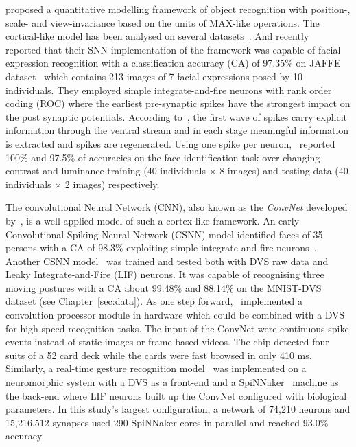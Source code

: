 \cite{riesenhuber1999hierarchical} proposed a quantitative modelling framework of object recognition with position-, scale- and view-invariance based on the units of MAX-like operations.
The cortical-like model has been analysed on several datasets~\citep{serre2007robust}.
And recently~\cite{fu2012spiking} reported that their SNN implementation of the framework was capable of facial expression recognition with a classification accuracy (CA) of 97.35\% on JAFFE dataset~\citep{lyons1998coding} which contains 213 images of 7 facial expressions posed by 10 individuals.
They employed simple integrate-and-fire neurons with rank order coding (ROC) where  the earliest pre-synaptic spikes have the strongest impact on the post synaptic potentials.
According to~\cite{vanrullen2002surfing}, the first wave of spikes  carry explicit information through the ventral stream and in each stage meaningful information is extracted and spikes are regenerated. 
Using one spike per neuron,~\cite{delorme2001face} reported 100\% and 97.5\% of accuracies on the face identification task over changing  contrast and luminance training (40 individuals $\times$ 8 images) and testing data (40 individuals $\times$ 2 images) respectively.

The convolutional Neural Network (CNN), also known as the \textit{ConvNet} developed by~\cite{lecun1998gradient}, is a well applied model of such a cortex-like framework.
An early Convolutional Spiking Neural Network (CSNN) model identified faces of 35 persons with a CA of 98.3\% exploiting simple integrate and fire neurons~\citep{matsugu2002convolutional}.
Another CSNN model~\citep{zhao2014feedforward} was trained and tested both with DVS raw data and Leaky Integrate-and-Fire (LIF) neurons.
It was capable of recognising three moving postures with a CA about 99.48\% and 88.14\% on the MNIST-DVS dataset (see Chapter~\ref{sec:data}).
As one step forward,~\cite{camunas2012event} implemented a convolution processor module in hardware which could be combined with a DVS for high-speed recognition tasks.
The input of the ConvNet were continuous spike events instead of static images or frame-based videos. 
The chip detected four suits of a 52 card deck while the cards were fast browsed in only 410 ms.
Similarly, a real-time gesture recognition model~\citep{liu2014real} was implemented on a neuromorphic system with a DVS as a front-end and a SpiNNaker~\citep{furber2014spinnaker} machine as the back-end where LIF neurons built up the ConvNet configured with biological parameters.
In this study's largest configuration, a network of 74,210 neurons and 15,216,512 synapses used 290 SpiNNaker cores in parallel and reached 93.0\% accuracy. 

